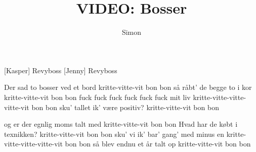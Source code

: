 \documentclass[a4paper,11pt]{article}
\title{VIDEO: Bosser}
\author{Simon}
\begin{document}
\maketitle

\begin{roles}
[Kasper] Revyboss
[Jenny] Revyboss
\end{roles}


\begin{song}
%
Der sad to bosser ved et bord
kritte-vitte-vit bon bon
så råbt' de begge to i kor
kritte-vitte-vit bon bon
fuck fuck fuck fuck fuck fuck mit liv
kritte-vitte-vitte-vitte-vit bon bon
sku' tallet ik' være positiv?
kritte-vitte-vit bon bon

og er der egnlig moms talt med
kritte-vitte-vit bon bon
Hvad har de købt i texnikken?
kritte-vitte-vit bon bon
sku' vi ik' bar' gang' med minus en
kritte-vitte-vitte-vitte-vit bon bon
så blev endnu et år talt op
kritte-vitte-vit bon bon
\end{song}
\end{document}
